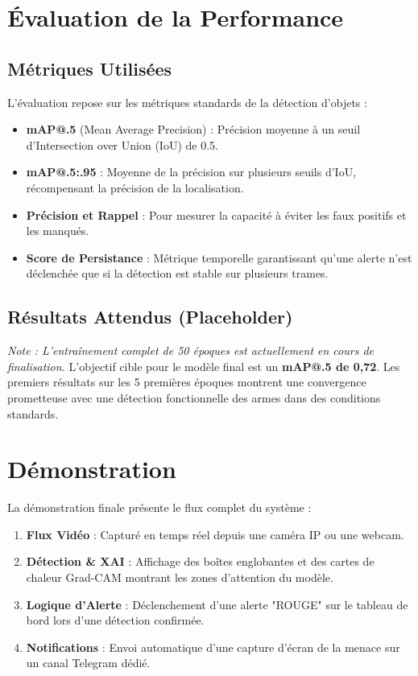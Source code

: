 \documentclass[a4paper,12pt]{article}
\begin{document}
\section{Évaluation de la Performance}
\subsection{Métriques Utilisées}
L'évaluation repose sur les métriques standards de la détection d'objets :
\begin{itemize}
    \item \textbf{mAP@.5} (Mean Average Precision) : Précision moyenne à un seuil d'Intersection over Union (IoU) de 0.5.
    \item \textbf{mAP@.5:.95} : Moyenne de la précision sur plusieurs seuils d'IoU, récompensant la précision de la localisation.
    \item \textbf{Précision et Rappel} : Pour mesurer la capacité à éviter les faux positifs et les manqués.
    \item \textbf{Score de Persistance} : Métrique temporelle garantissant qu'une alerte n'est déclenchée que si la détection est stable sur plusieurs trames.
\end{itemize}

\subsection{Résultats Attendus (Placeholder)}
\textit{Note : L'entraînement complet de 50 époques est actuellement en cours de finalisation.}
L'objectif cible pour le modèle final est un \textbf{mAP@.5 de 0,72}. Les premiers résultats sur les 5 premières époques montrent une convergence prometteuse avec une détection fonctionnelle des armes dans des conditions standards.

\section{Démonstration}
La démonstration finale présente le flux complet du système :
\begin{enumerate}
    \item \textbf{Flux Vidéo} : Capturé en temps réel depuis une caméra IP ou une webcam.
    \item \textbf{Détection & XAI} : Affichage des boîtes englobantes et des cartes de chaleur Grad-CAM montrant les zones d'attention du modèle.
    \item \textbf{Logique d'Alerte} : Déclenchement d'une alerte "ROUGE" sur le tableau de bord lors d'une détection confirmée.
    \item \textbf{Notifications} : Envoi automatique d'une capture d'écran de la menace sur un canal Telegram dédié.
\end{enumerate}
\end{document}
